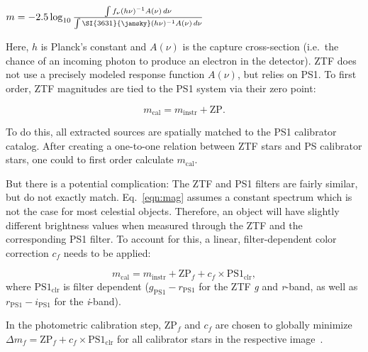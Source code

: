 \begin{definition}
    $m = -2.5 \log_{10}{\frac{\int{f_\nu(h \nu)^{-1}A(\nu)\,d\nu}}{\int{\SI{3631}{\jansky}(h \nu)^{-1}A(\nu)\,d\nu }}}$
\end{definition}
Here, $h$ is Planck's constant and $A(\nu)$ is the capture cross-section (i.e.\ the chance of an incoming photon to produce an electron in the detector). ZTF does not use a precisely modeled response function $A(\nu)$, but relies on PS1. To first order, ZTF magnitudes are tied to the PS1 system via their zero point:

\begin{equation}\label{eqn:mag}
    m_\text{cal} = m_\text{instr} + \text{ZP}.
\end{equation}

To do this, all extracted sources are spatially matched to the PS1 calibrator catalog. After creating a one-to-one relation between ZTF stars and PS calibrator stars, one could to first order calculate $m_\text{cal}$.

But there is a potential complication: The ZTF and PS1 filters are fairly similar, but do not exactly match. Eq.~\ref{eqn:mag} assumes a constant spectrum which is not the case for most celestial objects. Therefore, an object will have slightly different brightness values when measured through the ZTF and the corresponding PS1 filter. To account for this, a linear, filter-dependent color correction $c_f$ needs to be applied:

\begin{equation}
    m_\text{cal} = m_\text{instr} + \text{ZP}_f + c_f \times \text{PS1}_\text{clr},
\end{equation}
where $\text{PS1}_\text{clr}$ is filter dependent ($g_\text{PS1}-r_\text{PS1}$ for the ZTF \textit{g} and \textit{r}-band, as well as $r_\text{PS1}-i_\text{PS1}$ for the \textit{i}-band).

In the photometric calibration step, $\text{ZP}_f$ and $c_f$ are chosen to globally minimize $\Delta m_f = \text{ZP}_f + c_f \times \text{PS1}_\text{clr}$ for all calibrator stars in the respective image~\cite{Masci2019a}.

